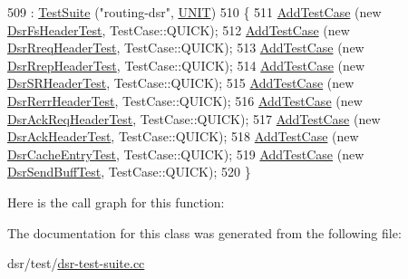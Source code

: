 \begin{DoxyCode}
509                   : \hyperlink{classns3_1_1TestSuite_a904b0c40583b744d30908aeb94636d1a}{TestSuite} (\textcolor{stringliteral}{"routing-dsr"}, \hyperlink{classns3_1_1TestSuite_a1ebfcab34ec8161e085e8e3a1855eae0a3885375a3787abf60431f8454b3cadbd}{UNIT})
510   \{
511     \hyperlink{classns3_1_1TestCase_a3718088e3eefd5d6454569d2e0ddd835}{AddTestCase} (\textcolor{keyword}{new} \hyperlink{classDsrFsHeaderTest}{DsrFsHeaderTest}, TestCase::QUICK);
512     \hyperlink{classns3_1_1TestCase_a3718088e3eefd5d6454569d2e0ddd835}{AddTestCase} (\textcolor{keyword}{new} \hyperlink{classDsrRreqHeaderTest}{DsrRreqHeaderTest}, TestCase::QUICK);
513     \hyperlink{classns3_1_1TestCase_a3718088e3eefd5d6454569d2e0ddd835}{AddTestCase} (\textcolor{keyword}{new} \hyperlink{classDsrRrepHeaderTest}{DsrRrepHeaderTest}, TestCase::QUICK);
514     \hyperlink{classns3_1_1TestCase_a3718088e3eefd5d6454569d2e0ddd835}{AddTestCase} (\textcolor{keyword}{new} \hyperlink{classDsrSRHeaderTest}{DsrSRHeaderTest}, TestCase::QUICK);
515     \hyperlink{classns3_1_1TestCase_a3718088e3eefd5d6454569d2e0ddd835}{AddTestCase} (\textcolor{keyword}{new} \hyperlink{classDsrRerrHeaderTest}{DsrRerrHeaderTest}, TestCase::QUICK);
516     \hyperlink{classns3_1_1TestCase_a3718088e3eefd5d6454569d2e0ddd835}{AddTestCase} (\textcolor{keyword}{new} \hyperlink{classDsrAckReqHeaderTest}{DsrAckReqHeaderTest}, TestCase::QUICK);
517     \hyperlink{classns3_1_1TestCase_a3718088e3eefd5d6454569d2e0ddd835}{AddTestCase} (\textcolor{keyword}{new} \hyperlink{classDsrAckHeaderTest}{DsrAckHeaderTest}, TestCase::QUICK);
518     \hyperlink{classns3_1_1TestCase_a3718088e3eefd5d6454569d2e0ddd835}{AddTestCase} (\textcolor{keyword}{new} \hyperlink{classDsrCacheEntryTest}{DsrCacheEntryTest}, TestCase::QUICK);
519     \hyperlink{classns3_1_1TestCase_a3718088e3eefd5d6454569d2e0ddd835}{AddTestCase} (\textcolor{keyword}{new} \hyperlink{classDsrSendBuffTest}{DsrSendBuffTest}, TestCase::QUICK);
520   \}
\end{DoxyCode}


Here is the call graph for this function\+:




The documentation for this class was generated from the following file\+:\begin{DoxyCompactItemize}
\item 
dsr/test/\hyperlink{dsr-test-suite_8cc}{dsr-\/test-\/suite.\+cc}\end{DoxyCompactItemize}
